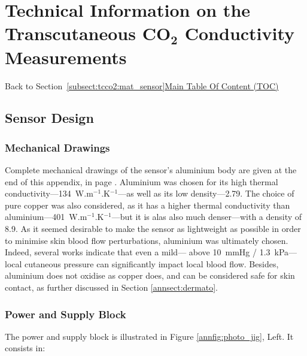 \chapter{Technical Information on the Transcutaneous \texorpdfstring{CO$_\textbf{2}$}{CO2} Conductivity Measurements}\label{app:tcco2_sm}

\begin{appbox}
	Back to Section~\ref{subsect:tcco2:mat_sensor}\hfill \hyperref[chapter:toc]{Main Table Of Content (TOC)}
\end{appbox}

\section{Sensor Design}

\subsection{Mechanical Drawings}

Complete mechanical drawings of the sensor's aluminium body are given at the end of this appendix, in page \pageref{annapp:al_body_drawing}. Aluminium was chosen for its high thermal conductivity---134~W.m$^{-1}$.K$^{-1}$---as well as its low density---2.79\cite{euralliage2017a}. The choice of pure copper was also considered, as it has a higher thermal conductivity than aluminium---401~W.m$^{-1}$.K$^{-1}$---but it is alas also much denser---with a density of 8.9\cite{davis2001_copper}. As it seemed desirable to make the sensor as lightweight as possible in order to minimise skin blood flow perturbations, aluminium was ultimately chosen. Indeed, several works indicate that even a mild---\ie{} above 10~mmHg / 1.3~kPa---local cutaneous pressure can significantly impact local blood flow\cite{daly1976, sacks1988, anosov2020}. Besides, aluminium does not oxidise as copper does, and can be considered safe for skin contact, as further discussed in Section \ref{annsect:dermato}.

\subsection{Power and Supply Block}

The power and supply block is illustrated in Figure \ref{annfig:photo_jig}, Left. It consists in:

